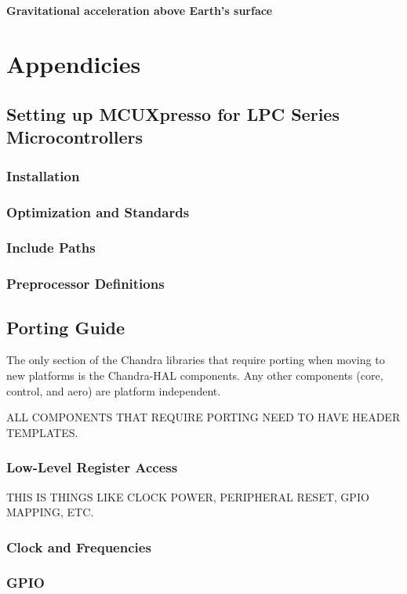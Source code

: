 \documentclass[10pt,letterpaper]{memoir} %
\begin{document}
\subsection{Gravitational acceleration above Earth's surface}

\appendix
\part{Appendicies}

\chapter{Setting up MCUXpresso for LPC Series Microcontrollers}
\section{Installation}
\section{Optimization and Standards}
\section{Include Paths}
\section{Preprocessor Definitions}

\chapter{Porting Guide}
The only section of the Chandra libraries that require porting when moving to new platforms is the Chandra-HAL components.  Any other components (core, control, and aero) are platform independent.

ALL COMPONENTS THAT REQUIRE PORTING NEED TO HAVE HEADER TEMPLATES.
\section{Low-Level Register Access}
THIS IS THINGS LIKE CLOCK POWER, PERIPHERAL RESET, GPIO MAPPING, ETC.
\section{Clock and Frequencies}
\section{GPIO}
\end{document}
